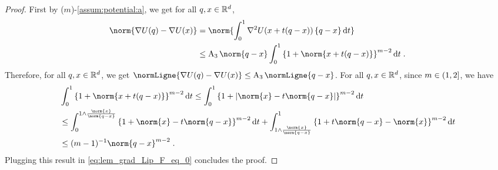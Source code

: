 \begin{proof}
First by ($m$)-\ref{assum:potential:a}, we get for all $q,x \in \mathbb{R}^d$,
\begin{align}
\nonumber
  \norm{\nabla \F(\q) - \nabla \F(\x)}
&= \norm{\int_{0}^1 \nabla^2 \F(\x +t(\q-\x)) \defEns{\q-\x} \rmd t } \\
\label{eq:lem_grad_Lip_F_eq_0}
&\leq \constone  \norm{\q-\x} \int_{0}^1 \defEns{1+\norm{\x +t(\q-\x)}}^{\m-2} \rmd t   \eqsp.
\end{align}
Therefore, for all $q,x \in \mathbb{R}^d$, we get $ \normLigne{\nabla \F(\q) - \nabla \F(\x)} \leq \constone \normLigne{\q-\x}$. For all $q, x \in \mathbb{R}^d$, since $m \in \left(1,2\right]$, we have
\begin{align}
&\int_{0}^1 \defEns{1+\norm{\x +t(\q-\x)}}^{\m-2} \rmd t  \leq  \int_{0}^1\defEns{ 1+\abs{\norm{\x} - t \norm{\q-\x}}}^{m-2}  \rmd t  \\
& \leq \int_{0}^{1 \wedge \frac{\norm{\x}}{\norm{\q-\x}}}\defEns{1+  \norm{\x} - t \norm{\q-\x}}^{m-2}  \rmd t
+ \int_{1 \wedge \frac{\norm{\x}}{\norm{\q-\x}}}^1 \defEns{1+ t \norm{\q-\x}-\norm{\x}}^{m-2}  \rmd t \\
&\leq (m-1)^{-1} \norm{\q-\x}^{m-2} \eqsp.
\end{align}
Plugging this result in \eqref{eq:lem_grad_Lip_F_eq_0} concludes the proof.


\end{proof}
